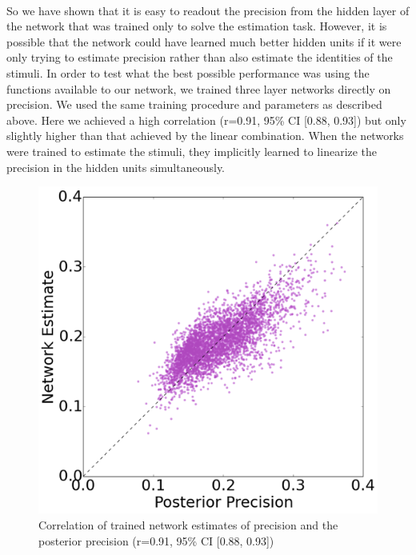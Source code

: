 \documentclass{article} %
\begin{document}
\\
So we have shown that it is easy to readout the precision from the hidden layer of the network that was trained only to solve the estimation task. However, it is possible that the network could have learned much better hidden units if it were only trying to estimate precision rather than also estimate the identities of the stimuli. In order to test what the best possible performance was using the functions available to our network, we trained three layer networks directly on precision. We used the same training procedure and parameters as described above. Here we achieved a high correlation (r=0.91, 95\% CI [0.88, 0.93]) but only slightly higher than that achieved by the linear combination. When the networks were trained to estimate the stimuli, they implicitly learned to linearize the precision in the hidden units simultaneously.
\begin{figure}[h]
\centering
\includegraphics[width = .5\textwidth]{Linear_Fixed_Gains_Precisions.png}
\caption{Correlation of trained network estimates of precision and the posterior precision (r=0.91, 95\% CI [0.88, 0.93])}
\end{figure}
\end{document}
